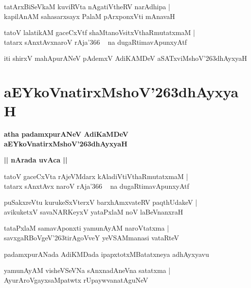 \documentclass[twoside,12pt,openright]{book}
\def\S{\char'263}
\newcounter{shloka}[chapter]
\def\uvaca#1{\centerline{{\large\textbf{#1}}}}
\begin{document}
\begin{shloka}
tatArxBiSeVkaM kuviRVta nAgatiVtheRV narAdhipa |\\
kapilAnAM sahasarxsayx PalaM pArxponxVti mAnavaH 
\end{shloka}

\begin{shloka}
tatoV lalatikAM gaceCxVtf shaMtanoVsitxVthaRmutatxmaM |\\
tatarx sAnxtAvxnaroV rAja\char'366 ~ na dugaRtimavApunxyAtf 
\end{shloka}

\begin{center}
iti shirxV mahApurANeV pAdemxV AdiKAMDeV aSATxviMshoV\S dhAyxyaH
\end{center}

\chapter{aEYkoVnatirxMshoV\S dhAyxyaH}

\begin{center}
{\LARGE\bfseries atha padamxpurANeV AdiKaMDeV aEYkoVnatirxMshoV\S dhAyxyaH}
\end{center}

\uvaca{|| nArada uvAca ||}

\begin{shloka}
tatoV gaceCxVta rAjeVMdarx kAladiVtiVthaRmutatxmaM |\\
tatarx sAnxtAvx naroV rAja\char'366 ~ na dugaRtimavApunxyAtf 
\end{shloka}

\begin{shloka}
puSakxreVtu kurukeSxVterxV barxhAmxvateRV paqthUdakeV |\\
avikuketxV savaNARKeyxV yataPxlaM noV laBeVnanxraH 
\end{shloka}

\begin{shloka}
tataPxlaM samavAponxti yamunAyAM naroVtatxma |\\
savxgaRBoVgeV\S tirAgoVveY yeVSAMmanasi vataRteV
\end{shloka}

\begin{center}
padamxpurANada AdiKMDada ipapxtotxMBatatxneya adhAyxyavu
\end{center}

\begin{shloka}
yamunAyAM visheVSeVNa sAnxnadAneVna satatxma |\\
AyurAroVgayxsaMpatwtx rUpaywvanatAguNeV
\end{shloka}
\end{document}
